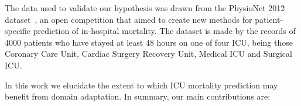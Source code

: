 The data used to validate our hypothesis was drawn from the PhysioNet 2012 dataset~\citep{silva}, an open competition that aimed to create new methods for patient-specific prediction of in-hospital mortality. The dataset is made by the records of 4000 patients who have stayed at least 48 hours on one of four ICU, being those Coronary Care Unit, Cardiac Surgery Recovery Unit, Medical ICU and Surgical ICU.



In this work we elucidate the extent to which ICU mortality prediction may benefit from domain adaptation. In summary, our main contributions are:
